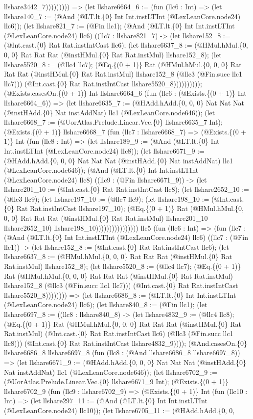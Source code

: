 \documentclass[11pt]{article}
\begin{document}
llshare3442\_7))))))))) => (let llshare6664\_6 := (fun (llc6 : Int) => (let llshare140\_7 := (@And (@LT.lt.\{0\} Int Int.instLTInt (@LexLeanCore.node24) llc6)); (let llshare821\_7 := (@Fin llc1); (@And (@LT.lt.\{0\} Int Int.instLTInt (@LexLeanCore.node24) llc6) ((llc7 : llshare821\_7) -> (let llshare152\_8 := (@Int.cast.\{0\} Rat Rat.instIntCast llc6); (let llshare6637\_8 := (@HMul.hMul.\{0, 0, 0\} Rat Rat Rat (@instHMul.\{0\} Rat Rat.instMul) llshare152\_8); (let llshare5520\_8 := (@llc4 llc7); (@Eq.\{(0 + 1)\} Rat (@HMul.hMul.\{0, 0, 0\} Rat Rat Rat (@instHMul.\{0\} Rat Rat.instMul) llshare152\_8 (@llc3 (@Fin.succ llc1 llc7))) (@Int.cast.\{0\} Rat Rat.instIntCast llshare5520\_8)))))))))); (@Exists.casesOn.\{(0 + 1)\} Int llshare6664\_6 (fun (llc6 : (@Exists.\{(0 + 1)\} Int llshare6664\_6)) => (let llshare6635\_7 := (@HAdd.hAdd.\{0, 0, 0\} Nat Nat Nat (@instHAdd.\{0\} Nat instAddNat) llc1 (@LexLeanCore.node646)); (let llshare6668\_7 := (@UorAtlas.Prelude.Linear.Vec.\{0\} llshare6635\_7 Int); (@Exists.\{(0 + 1)\} llshare6668\_7 (fun (llc7 : llshare6668\_7) => (@Exists.\{(0 + 1)\} Int (fun (llc8 : Int) => (let llshare189\_9 := (@And (@LT.lt.\{0\} Int Int.instLTInt (@LexLeanCore.node24) llc8)); (let llshare6671\_9 := (@HAdd.hAdd.\{0, 0, 0\} Nat Nat Nat (@instHAdd.\{0\} Nat instAddNat) llc1 (@LexLeanCore.node646)); (@And (@LT.lt.\{0\} Int Int.instLTInt (@LexLeanCore.node24) llc8) ((llc9 : (@Fin llshare6671\_9)) -> (let llshare201\_10 := (@Int.cast.\{0\} Rat Rat.instIntCast llc8); (let llshare2652\_10 := (@llc3 llc9); (let llshare197\_10 := (@llc7 llc9); (let llshare198\_10 := (@Int.cast.\{0\} Rat Rat.instIntCast llshare197\_10); (@Eq.\{(0 + 1)\} Rat (@HMul.hMul.\{0, 0, 0\} Rat Rat Rat (@instHMul.\{0\} Rat Rat.instMul) llshare201\_10 llshare2652\_10) llshare198\_10)))))))))))))))) llc5 (fun (llc6 : Int) => (fun (llc7 : (@And (@LT.lt.\{0\} Int Int.instLTInt (@LexLeanCore.node24) llc6) ((llc7 : (@Fin llc1)) -> (let llshare152\_8 := (@Int.cast.\{0\} Rat Rat.instIntCast llc6); (let llshare6637\_8 := (@HMul.hMul.\{0, 0, 0\} Rat Rat Rat (@instHMul.\{0\} Rat Rat.instMul) llshare152\_8); (let llshare5520\_8 := (@llc4 llc7); (@Eq.\{(0 + 1)\} Rat (@HMul.hMul.\{0, 0, 0\} Rat Rat Rat (@instHMul.\{0\} Rat Rat.instMul) llshare152\_8 (@llc3 (@Fin.succ llc1 llc7))) (@Int.cast.\{0\} Rat Rat.instIntCast llshare5520\_8)))))))) => (let llshare6686\_8 := (@LT.lt.\{0\} Int Int.instLTInt (@LexLeanCore.node24) llc6); (let llshare840\_8 := (@Fin llc1); (let llshare6697\_8 := ((llc8 : llshare840\_8) -> (let llshare4832\_9 := (@llc4 llc8); (@Eq.\{(0 + 1)\} Rat (@HMul.hMul.\{0, 0, 0\} Rat Rat Rat (@instHMul.\{0\} Rat Rat.instMul) (@Int.cast.\{0\} Rat Rat.instIntCast llc6) (@llc3 (@Fin.succ llc1 llc8))) (@Int.cast.\{0\} Rat Rat.instIntCast llshare4832\_9)))); (@And.casesOn.\{0\} llshare6686\_8 llshare6697\_8 (fun (llc8 : (@And llshare6686\_8 llshare6697\_8)) => (let llshare6671\_9 := (@HAdd.hAdd.\{0, 0, 0\} Nat Nat Nat (@instHAdd.\{0\} Nat instAddNat) llc1 (@LexLeanCore.node646)); (let llshare6702\_9 := (@UorAtlas.Prelude.Linear.Vec.\{0\} llshare6671\_9 Int); (@Exists.\{(0 + 1)\} llshare6702\_9 (fun (llc9 : llshare6702\_9) => (@Exists.\{(0 + 1)\} Int (fun (llc10 : Int) => (let llshare297\_11 := (@And (@LT.lt.\{0\} Int Int.instLTInt (@LexLeanCore.node24) llc10)); (let llshare6705\_11 := (@HAdd.hAdd.\{0, 0, 
\end{document}
